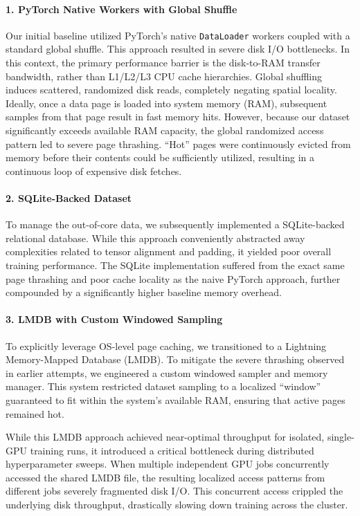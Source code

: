 \paragraph{1. PyTorch Native Workers with Global Shuffle}
Our initial baseline utilized PyTorch's native \texttt{DataLoader} workers coupled with a standard global shuffle. This approach resulted in severe disk I/O bottlenecks. In this context, the primary performance barrier is the disk-to-RAM transfer bandwidth, rather than L1/L2/L3 CPU cache hierarchies. Global shuffling induces scattered, randomized disk reads, completely negating spatial locality. Ideally, once a data page is loaded into system memory (RAM), subsequent samples from that page result in fast memory hits. However, because our dataset significantly exceeds available RAM capacity, the global randomized access pattern led to severe page thrashing. ``Hot'' pages were continuously evicted from memory before their contents could be sufficiently utilized, resulting in a continuous loop of expensive disk fetches.

\paragraph{2. SQLite-Backed Dataset}
To manage the out-of-core data, we subsequently implemented a SQLite-backed relational database. While this approach conveniently abstracted away complexities related to tensor alignment and padding, it yielded poor overall training performance. The SQLite implementation suffered from the exact same page thrashing and poor cache locality as the naive PyTorch approach, further compounded by a significantly higher baseline memory overhead.

\paragraph{3. LMDB with Custom Windowed Sampling}
To explicitly leverage OS-level page caching, we transitioned to a Lightning Memory-Mapped Database (LMDB). To mitigate the severe thrashing observed in earlier attempts, we engineered a custom windowed sampler and memory manager. This system restricted dataset sampling to a localized ``window'' guaranteed to fit within the system's available RAM, ensuring that active pages remained hot.

While this LMDB approach achieved near-optimal throughput for isolated, single-GPU training runs, it introduced a critical bottleneck during distributed hyperparameter sweeps. When multiple independent GPU jobs concurrently accessed the shared LMDB file, the resulting localized access patterns from different jobs severely fragmented disk I/O. This concurrent access crippled the underlying disk throughput, drastically slowing down training across the cluster.

